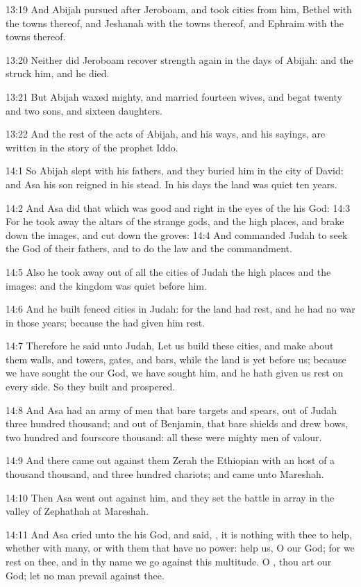 13:19 And Abijah pursued after Jeroboam, and took cities from him,
Bethel with the towns thereof, and Jeshanah with the towns thereof,
and Ephraim with the towns thereof.

13:20 Neither did Jeroboam recover strength again in the days of
Abijah: and the \LORD struck him, and he died.

13:21 But Abijah waxed mighty, and married fourteen wives, and begat
twenty and two sons, and sixteen daughters.

13:22 And the rest of the acts of Abijah, and his ways, and his
sayings, are written in the story of the prophet Iddo.

14:1 So Abijah slept with his fathers, and they buried him in the city
of David: and Asa his son reigned in his stead. In his days the land
was quiet ten years.

14:2 And Asa did that which was good and right in the eyes of the \LORD
his God: 14:3 For he took away the altars of the strange gods, and the
high places, and brake down the images, and cut down the groves: 14:4
And commanded Judah to seek the \LORD God of their fathers, and to do
the law and the commandment.

14:5 Also he took away out of all the cities of Judah the high places
and the images: and the kingdom was quiet before him.

14:6 And he built fenced cities in Judah: for the land had rest, and
he had no war in those years; because the \LORD had given him rest.

14:7 Therefore he said unto Judah, Let us build these cities, and make
about them walls, and towers, gates, and bars, while the land is yet
before us; because we have sought the \LORD our God, we have sought
him, and he hath given us rest on every side. So they built and
prospered.

14:8 And Asa had an army of men that bare targets and spears, out of
Judah three hundred thousand; and out of Benjamin, that bare shields
and drew bows, two hundred and fourscore thousand: all these were
mighty men of valour.

14:9 And there came out against them Zerah the Ethiopian with an host
of a thousand thousand, and three hundred chariots; and came unto
Mareshah.

14:10 Then Asa went out against him, and they set the battle in array
in the valley of Zephathah at Mareshah.

14:11 And Asa cried unto the \LORD his God, and said, \LORD, it is
nothing with thee to help, whether with many, or with them that have
no power: help us, O \LORD our God; for we rest on thee, and in thy
name we go against this multitude. O \LORD, thou art our God; let no
man prevail against thee.

